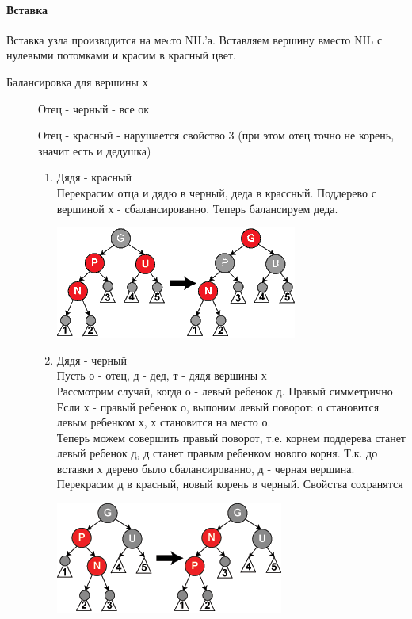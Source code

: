 \documentclass[a4paper,10pt]{article}
\begin{document}
\paragraph{Вставка}
Вставка узла производится на меcто NIL'а. Вставляем вершину вместо NIL с нулевыми потомками и красим в красный цвет. \\
\begin{center} Балансировка для вершины х \end{center}
\begin{description}
	\item[]Отец - черный - все ок
	\item[]Отец - красный - нарушается свойство 3 (при этом отец точно не корень, значит есть и дедушка)\\
\begin{enumerate}
	\item Дядя - красный\\
		Перекрасим отца и дядю в черный, деда в крассный. Поддерево с вершиной х - сбалансированно. Теперь балансируем деда.\\
\begin{center}\includegraphics{rbt_in_ru.png}\end{center} 

	\item Дядя - черный\\
Пусть о - отец, д - дед, т - дядя вершины х\\
		Рассмотрим случай, когда о - левый ребенок д. Правый симметрично\\
		Если х - правый ребенок о, выпоним левый поворот: о становится левым ребенком х, х становится на место о.\\
		Теперь можем совершить правый поворот, т.е. корнем поддерева станет левый ребенок д, д станет правым ребенком нового корня. Т.к. до вставки х дерево было сбалансированно, д - черная вершина. Перекрасим д в красный, новый корень в черный. Свойства сохранятся\\
\begin{center}\includegraphics{rbt_in_bu.png}\end{center} 
\end{enumerate}
\end{description}
\end{document}
